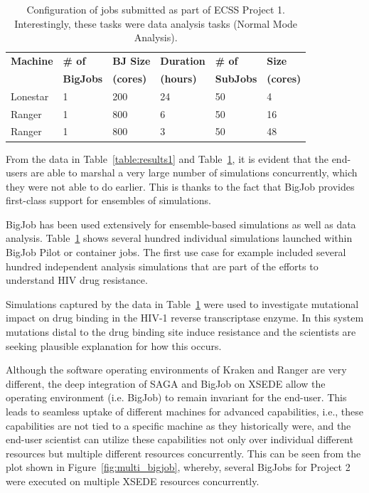 \documentclass{sig-alternate}
\begin{document}
\begin{table}[h]
\begin{center}
\begin{tabular}{p{1.1cm}p{1.2cm}p{1.2cm}p{1.2cm}p{1.1cm}p{0.8cm}}
\toprule
\textbf{Machine}  & 
\textbf{\# of}    &
\textbf{BJ Size}     & 
\textbf{Duration} & 
\textbf{\# of}    &
\textbf{Size}     \\
                  &
\textbf{BigJobs}  &
\textbf{(cores)} &
\textbf{(hours)}  &
\textbf{SubJobs}  &
\textbf{(cores)} 
                  \\ \midrule
Lonestar & 1 &  200 & 24 &  50 &  4 \\ \midrule
Ranger   & 1 &  800 &  6 &  50 & 16 \\ \midrule
Ranger   & 1 &  800 &  3 &  50 & 48 \\ \bottomrule
\end{tabular}
\caption{Configuration of jobs submitted as part of ECSS Project
  1. Interestingly, these tasks were data analysis tasks (Normal Mode
  Analysis).}
\label{table:results}
\end{center}
 \end{table}

From the data in Table~\ref{table:results1} and
Table~\ref{table:results}, it is evident that the end-users are able
to marshal a very large number of simulations concurrently, which
they were not able to do earlier. This is thanks to the fact that
BigJob provides first-class support for ensembles of simulations.

BigJob has been used extensively for ensemble-based simulations as well as data
analysis. Table~\ref{table:results} shows several hundred individual simulations
launched within BigJob Pilot or container jobs. The first use case for example
included several hundred independent analysis simulations that are part of the
efforts to understand HIV drug resistance.

Simulations captured by the data in Table~\ref{table:results} were
used to investigate mutational impact on drug binding in the HIV-1
reverse transcriptase enzyme. In this system mutations distal to the
drug binding site induce resistance and the scientists are seeking
plausible explanation for how this occurs.

Although the software operating environments of Kraken and Ranger are
very different, the deep integration of SAGA and BigJob on
XSEDE allow the operating environment (i.e. BigJob) to remain
invariant for the end-user. 
This leads to seamless uptake of different machines for
advanced capabilities, i.e., these capabilities are not tied to a
specific machine as they historically were, and the end-user scientist can
utilize these capabilities not only over individual different
resources but multiple different resources concurrently. This can be
seen from the plot shown in Figure~\ref{fig:multi_bigjob}, whereby,
several BigJobs for Project 2 were executed on multiple XSEDE resources
concurrently.
\end{document}

